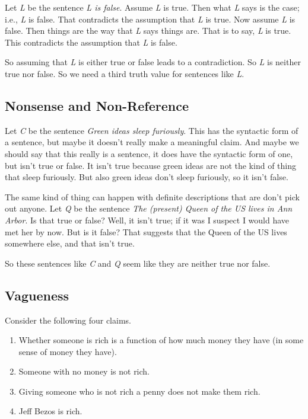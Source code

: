 \documentclass[
]{article}
\providecommand{\tightlist}{%
  \setlength{\itemsep}{0pt}\setlength{\parskip}{0pt}}\usepackage{longtable,booktabs,array}
\begin{document}
Let \emph{L} be the sentence \emph{L is false}. Assume \emph{L} is true.
Then what \emph{L} says is the case; i.e., \emph{L} is false. That
contradicts the assumption that \emph{L} is true. Now assume \emph{L} is
false. Then things are the way that \emph{L} says things are. That is to
say, \emph{L} is true. This contradicts the assumption that \emph{L} is
false.

So assuming that \emph{L} is either true or false leads to a
contradiction. So \emph{L} is neither true nor false. So we need a third
truth value for sentences like \emph{L}.

\hypertarget{nonsense-and-non-reference}{%
\subsection{Nonsense and
Non-Reference}\label{nonsense-and-non-reference}}

Let \emph{C} be the sentence \emph{Green ideas sleep furiously}. This
has the syntactic form of a sentence, but maybe it doesn't really make a
meaningful claim. And maybe we should say that this really is a
sentence, it does have the syntactic form of one, but isn't true or
false. It isn't true because green ideas are not the kind of thing that
sleep furiously. But also green ideas don't sleep furiously, so it isn't
false.

The same kind of thing can happen with definite descriptions that are
don't pick out anyone. Let \emph{Q} be the sentence \emph{The (present)
Queen of the US lives in Ann Arbor}. Is that true or false? Well, it
isn't true; if it was I suspect I would have met her by now. But is it
false? That suggests that the Queen of the US lives somewhere else, and
that isn't true.

So these sentences like \emph{C} and \emph{Q} seem like they are neither
true nor false.

\hypertarget{vagueness}{%
\subsection{Vagueness}\label{vagueness}}

Consider the following four claims.

\begin{enumerate}
\def\labelenumi{\arabic{enumi}.}
\setcounter{enumi}{-1}
\tightlist
\item
  Whether someone is rich is a function of how much money they have (in
  some sense of money they have).
\item
  Someone with no money is not rich.
\item
  Giving someone who is not rich a penny does not make them rich.
\item
  Jeff Bezos is rich.
\end{enumerate}
\end{document}
